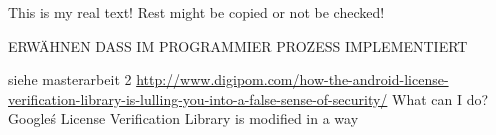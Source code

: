 This is my real text! Rest might be copied or not be checked!

ERWÄHNEN DASS IM PROGRAMMIER PROZESS  IMPLEMENTIERT\newline

siehe masterarbeit 2
\url{http://www.digipom.com/how-the-android-license-verification-library-is-lulling-you-into-a-false-sense-of-security/} What can I do?
\newline
 Google\'s License Verification Library is modified in a way
